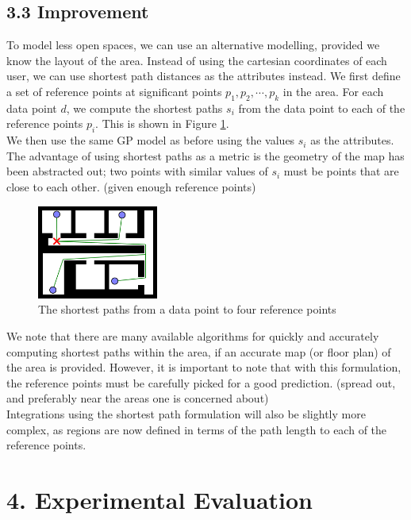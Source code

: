 \documentclass[letterpaper]{article}
\begin{document}
\subsection{3.3  Improvement}

To model less open spaces, we can use an alternative modelling, provided we know the layout of the area. Instead of using the cartesian coordinates of each user, we can use shortest path distances as the attributes instead. We first define a set of reference points at significant points $p_1,p_2,\cdots,p_k$ in the area. For each data point $d$, we compute the shortest paths $s_i$ from the data point to each of the reference points $p_i$. This is shown in Figure \ref{fig:spaths}. \\

We then use the same GP model as before using the values $s_i$ as the attributes. The advantage of using shortest paths as a metric is the geometry of the map has been abstracted out; two points with similar values of $s_i$ must be points that are close to each other. (given enough reference points)

\begin{figure}[h!]
  \centering
    \includegraphics[width=150px,natwidth=570,natheight=442]{shortestpaths.png}
  \caption{The shortest paths from a data point to four reference points}
  \label{fig:spaths}
\end{figure}

We note that there are many available algorithms for quickly and accurately computing shortest paths within the area, if an accurate map (or floor plan) of the area is provided. However, it is important to note that with this formulation, the reference points must be carefully picked for a good prediction. (spread out, and preferably near the areas one is concerned about)\\

Integrations using the shortest path formulation will also be slightly more complex, as regions are now defined in terms of the path length to each of the reference points.

\section{4.  Experimental Evaluation}
\end{document}
